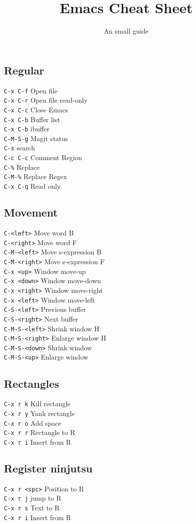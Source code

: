 \documentclass{article}
\title{\vspace{-1.5cm} Emacs Cheat Sheet}
\author{An small guide}
\date{}
\begin{document}
\newcommand{\command}[2]{
  \texttt{#1} \hfill #2 \\
}

\begin{multicols*}{4}
\maketitle
\section*{Regular}

\command{C-x C-f}{Open file}
\command{C-x C-r}{Open file read-only}
\command{C-x C-c}{Close Emacs}
\command{C-x C-b}{Buffer list}
\command{C-x C-b}{ibuffer}
\command{C-M-S-g}{Magit status}
\command{C-s}{search}
\command{C-c C-c}{Comment Region}
\command{C-\%}{Replace}
\command{C-M-\%}{Replace Regex}
\command{C-x C-q}{Read only}

\subsection*{Movement}

\command{C-<left>}{Move word B}
\command{C-<right>}{Move word F}
\command{C-M-<left>}{Move s-expression B}
\command{C-M-<right>}{Move s-expression F}

\command{C-x <up>}{Window move-up}
\command{C-x <down>}{Window move-down}
\command{C-x <right>}{Window move-right}
\command{C-x <left>}{Window move-left}

\command{C-S-<left>}{Previous buffer}
\command{C-S-<right>}{Next buffer}
\command{C-M-S-<left>}{Shrink window H}
\command{C-M-S-<right>}{Enlarge window H}
\command{C-M-S-<down>}{Shrink window}
\command{C-M-S-<up>}{Enlarge window}

\subsection*{Rectangles}
\command{C-x r k}{Kill rectangle}
\command{C-x r y}{Yank rectangle}
\command{C-x r o}{Add space}
\command{C-x r r}{Rectangle to R}
\command{C-x r i}{Insert from R}

\subsection*{Register ninjutsu}

\command{C-x r <spc>}{Position to R}
\command{C-x r j}{jump to R}

\command{C-x r s}{Text to R}
\command{C-x r i}{Insert from R}


\end{multicols*}
\end{document}
